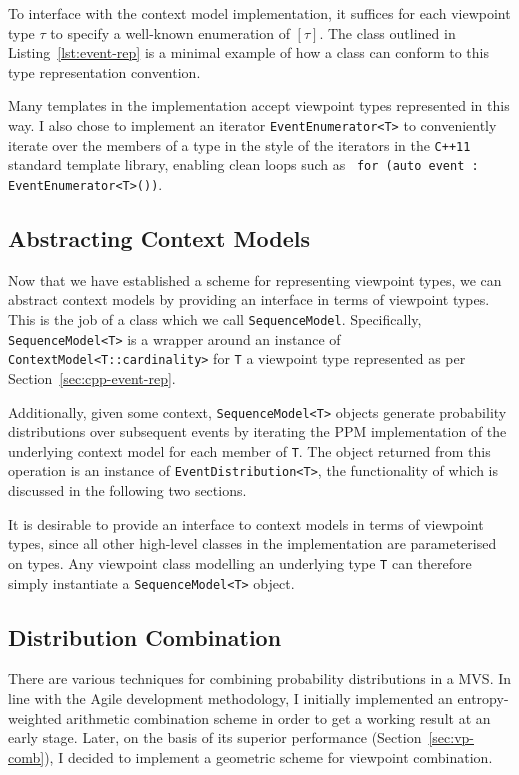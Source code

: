 \documentclass[12pt,a4paper,twoside,openright]{report}
\newcommand{\cppi}[1]{{\small \texttt{#1}}}
\begin{document}
To interface with the context model implementation, it suffices for each
viewpoint type $\tau$ to specify a well-known enumeration of $[\tau]$. The class
outlined in Listing~\ref{lst:event-rep} is a minimal example of how a class can
conform to this type representation convention.

Many templates in the implementation accept viewpoint types represented in this
way. I also chose to implement an iterator \texttt{EventEnumerator<T>} to
conveniently iterate over the members of a type in the style of the iterators in
the \texttt{C++11} standard template library, enabling clean loops such as~
\cppi{for (auto event : EventEnumerator<T>())}.

\subsection{Abstracting Context Models}

Now that we have established a scheme for representing viewpoint types, we can
abstract context models by providing an interface in terms of viewpoint types.
This is the job of a class which we call \texttt{SequenceModel}.  Specifically,
\texttt{SequenceModel<T>} is a wrapper around an instance of
\texttt{ContextModel<T::cardinality>} for \texttt{T} a viewpoint type
represented as per Section~\ref{sec:cpp-event-rep}. 

Additionally, given some context, \texttt{SequenceModel<T>} objects generate
probability distributions over subsequent events by iterating the PPM
implementation of the underlying context model for each member of \texttt{T}.
The object returned from this operation is an instance of
\texttt{EventDistribution<T>}, the functionality of which is discussed in the
following two sections.

It is desirable to provide an interface to context models in terms of viewpoint
types, since all other high-level classes in the implementation are
parameterised on types. Any viewpoint class modelling an underlying type
\texttt{T} can therefore simply instantiate a \texttt{SequenceModel<T>} object.

\subsection{Distribution Combination}

There are various techniques for combining probability distributions in a MVS.
In line with the Agile development methodology, I initially implemented an
entropy-weighted arithmetic combination scheme in order to get a working result
at an early stage. Later, on the basis of its superior performance
(Section~\ref{sec:vp-comb}), I decided to implement a geometric scheme for
viewpoint combination.  
\end{document}
